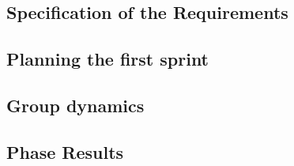 \subsection{Specification of the Requirements}

\subsection{Planning the first sprint}

\subsection{Group dynamics}

\subsection{Phase Results}
